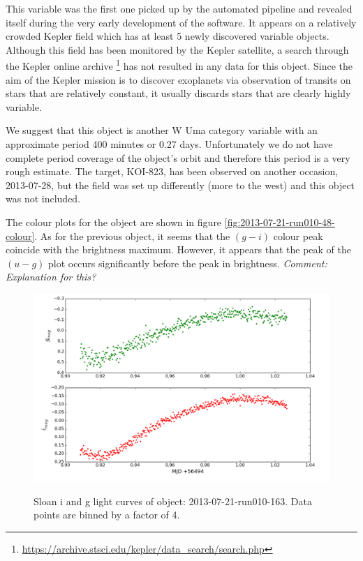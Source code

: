 This variable was the first one picked up by the automated pipeline and revealed itself during the very early development of the software. It appears on a relatively crowded Kepler field which has at least 5 newly discovered variable objects. Although this field has been monitored by the Kepler satellite, a search through the Kepler online archive \footnote{\url{https://archive.stsci.edu/kepler/data_search/search.php}} has not resulted in any data for this object. Since the aim of the Kepler mission is to discover exoplanets via observation of transits on stars that are relatively constant, it usually discards stars that are clearly highly variable. 

We suggest that this object is another {W Uma} category variable with an approximate period 400 minutes or 0.27 days. Unfortunately we do not have complete period coverage of the object's orbit and therefore this period is a very rough estimate. The target, KOI-823, has been observed on another occasion, 2013-07-28, but the field was set up differently (more to the west) and this object was not included. 

The colour plots for the object are shown in figure \ref{fig:2013-07-21-run010-48-colour}. As for the previous object, it seems that the $(g-i)$ colour peak coincide with the brightness maximum. However, it appears that the peak of the $(u-g)$ plot occurs significantly before the peak in brightness. \emph{Comment: Explanation for this?}

\newpage

\begin{figure}
  \center
  \includegraphics[width=120mm]{images/2013-07-21-run010-163_lightcurve-bin4.png}
  \label{fig:2013-07-21-run010-163}
  \caption{Sloan i and g light curves of object: 2013-07-21-run010-163. Data points are binned by a factor of 4.}
\end{figure}

